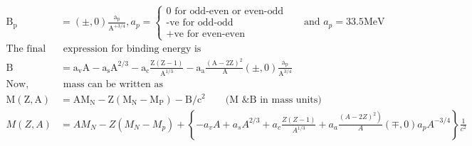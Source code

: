 \begin{align*}
\mathrm{B}_{\mathrm{p}}&=(\pm, 0) \frac{\mathrm{a}_{\mathrm{p}}}{\mathrm{A}^{+3 / 4}}, a_p=\left\{\begin{array}{l}
0 \text { for odd-even or even-odd } \\
\text {-ve for odd-odd } \\
+\mathrm{ve} \text { for even-even }
\end{array} \quad \text { and } a_p=33.5 \mathrm{MeV}\right.\\
\text{The final}&\text{ expression for binding energy is}\\
\mathrm{B}&=\mathrm{a}_{\mathrm{v}} \mathrm{A}-\mathrm{a}_{\mathrm{s}} \mathrm{A}^{2 / 3}-\mathrm{a}_{\mathrm{c}} \frac{\mathrm{Z}(\mathrm{Z}-1)}{\mathrm{A}^{1 / 3}}-\mathrm{a}_{\mathrm{a}} \frac{(\mathrm{A}-2 \mathrm{Z})^2}{\mathrm{~A}}(\pm, 0) \frac{\mathrm{a}_{\mathrm{p}}}{\mathrm{A}^{3 / 4}}\\
\text{Now, nuclear}&\text{ mass can be written as}\\
\mathrm{M}(\mathrm{Z}, \mathrm{A})&=\mathrm{AM}_{\mathrm{N}}-\mathrm{Z}\left(\mathrm{M}_{\mathrm{N}}-\mathrm{M}_{\mathrm{P}}\right)-\mathrm{B} / \mathrm{c}^2\qquad
\text{(M \& B in mass units)}\\
M(Z, A)&=A M_N-Z\left(M_N-M_p\right)+\left\{-a_v A+a_s A^{2 / 3}+a_c \frac{Z(Z-1)}{A^{1 / 3}}+a_a \frac{\left.(A-2 Z)^2\right)}{A}(\mp, 0) a_p A^{-3 / 4}\right\} \frac{1}{c^2}
\end{align*}
